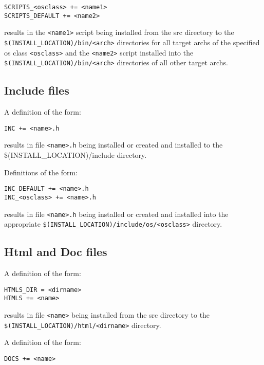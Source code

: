 \begin{verbatim}
SCRIPTS_<osclass> += <name1>
SCRIPTS_DEFAULT += <name2>
\end{verbatim}

results in the \verb|<name1>| script being installed from the src directory to the \verb|$(INSTALL_LOCATION)/bin/<arch>| 
directories for all target archs of the specified os class \verb|<osclass>| and the \verb|<name2>| script installed into the 
\verb|$(INSTALL_LOCATION)/bin/<arch>| directories of all other target archs.

\subsection{Include files}

A definition of the form:

\begin{verbatim}
INC += <name>.h
\end{verbatim}

results in file \verb|<name>.h| being installed or created and installed to the \$(INSTALL\_LOCATION)/include directory. 

Definitions of the form:

\begin{verbatim}
INC_DEFAULT += <name>.h
INC_<osclass> += <name>.h
\end{verbatim}

results in file \verb|<name>.h| being installed or created and installed into the appropriate \verb|$(INSTALL_LOCATION)/include/os/<osclass>| directory.

\subsection{Html and Doc files}

A definition of the form:

\begin{verbatim}
HTMLS_DIR = <dirname>
HTMLS += <name>
\end{verbatim}

results in file \verb|<name>| being installed from the src directory to the \verb|$(INSTALL_LOCATION)/html/<dirname>| directory. 

A definition of the form:

\begin{verbatim}
DOCS += <name>
\end{verbatim}

